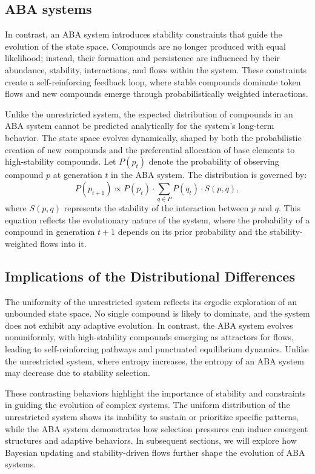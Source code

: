 \documentclass[entropy,article,submit,pdftex,oneauthor]{Definitions/mdpi}
\begin{document}
\subsection{ABA systems}

In contrast, an ABA system introduces stability constraints that guide the evolution of the state space. Compounds are no longer produced with equal likelihood; instead, their formation and persistence are influenced by their abundance, stability, interactions, and flows within the system. These constraints create a self-reinforcing feedback loop, where stable compounds dominate token flows and new compounds emerge through probabilistically weighted interactions.

Unlike the unrestricted system, the expected distribution of compounds in an ABA system cannot be predicted analytically for the system's long-term behavior. The state space evolves dynamically, shaped by both the probabilistic creation of new compounds and the preferential allocation of base elements to high-stability compounds. Let \( P(p_t) \) denote the probability of observing compound \( p \) at generation \( t \) in the ABA system. The distribution is governed by:
\begin{equation}
P(p_{t+1}) \propto P(p_t) \cdot \sum_{q \in P} P(q_t) \cdot S(p, q),
\end{equation}
where \( S(p, q) \) represents the stability of the interaction between \( p \) and \( q \). This equation reflects the evolutionary nature of the system, where the probability of a compound in generation \( t+1 \) depends on its prior probability and the stability-weighted flows into it. 

\subsection{Implications of the Distributional Differences}

The uniformity of the unrestricted system reflects its ergodic exploration of an unbounded state space. No single compound is likely to dominate, and the system does not exhibit any adaptive evolution. In contrast, the ABA system evolves nonuniformly, with high-stability compounds emerging as attractors for flows, leading to self-reinforcing pathways and punctuated equilibrium \cite{gould1977punctuated} dynamics. Unlike the unrestricted system, where entropy increases, the entropy of an ABA system may decrease due to stability selection.

These contrasting behaviors highlight the importance of stability and constraints in guiding the evolution of complex systems. The uniform distribution of the unrestricted system shows its inability to sustain or prioritize specific patterns, while the ABA system demonstrates how selection pressures can induce emergent structures and adaptive behaviors. In subsequent sections, we will explore how Bayesian updating and stability-driven flows further shape the evolution of ABA systems.
\end{document}
